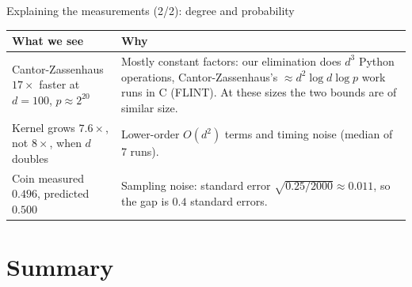 \documentclass[aspectratio=169,11pt]{beamer}
\begin{document}
\begin{frame}{Explaining the measurements (2/2): degree and probability}
  \small
  \renewcommand{\arraystretch}{1.2}
  \begin{tabular}{@{}L{0.31\textwidth}L{0.65\textwidth}@{}}
    \toprule
    \textbf{What we see} & \textbf{Why} \\
    \midrule
    Cantor-Zassenhaus $17\times$ faster at $d = 100$, $p \approx 2^{20}$ &
      Mostly constant factors: our elimination does $d^3$ Python operations, Cantor-Zassenhaus's $\approx d^2 \log d \log p$ work runs in C (FLINT). At these sizes the two bounds are of similar size. \\
    Kernel grows $7.6\times$, not $8\times$, when $d$ doubles &
      Lower-order $O(d^2)$ terms and timing noise (median of 7 runs). \\
    Coin measured $0.496$, predicted $0.500$ &
      Sampling noise: standard error $\sqrt{0.25/2000} \approx 0.011$, so the gap is $0.4$ standard errors. \\
    \bottomrule
  \end{tabular}
\end{frame}

\section{Summary}
\end{document}
